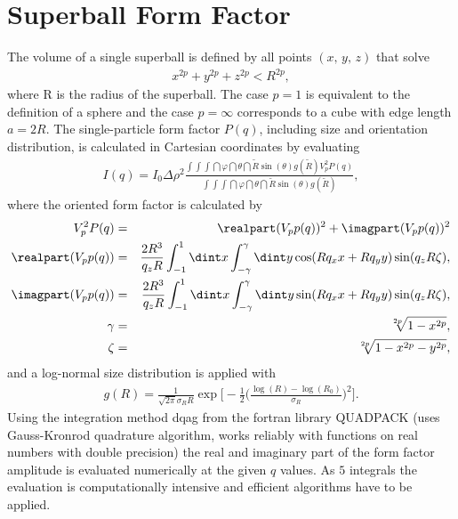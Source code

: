 \documentclass[\main/dresen_thesis.tex]{subfiles}
\begin{document}
\section{Superball Form Factor}\label{ch:appendix:numericalMethods:superballFormfactor}

The volume of a single superball is defined by all points $(x,\, y,\, z)$ that solve
\begin{align}
x^{2p} + y^{2p} + z^{2p} < R^{2p},
\end{align}
where R is the radius of the superball.  The case $p=1$ is equivalent to the definition of a sphere and the case $p=\infty$ corresponds to a cube with edge length $a=2R$. 
The single-particle form factor $P(q)$, including size and orientation distribution, is calculated in Cartesian coordinates by evaluating
\begin{align}
I(q) = I_0 \Delta \rho^2
\frac{\int \int \int \dint \varphi \dint \theta \dint \tilde{R}  \sin (\theta) g(\tilde{R})  V_p^2 P(q)}
{\int \int \int \dint \varphi \dint \theta \dint \tilde{R} \sin (\theta)  g(\tilde{R}) }, 
\label{eq:superball_intensity_equation}
\end{align}
where the oriented form factor is calculated by
\begin{eqnarray}
V_p^2 P(q) &=& \realpart (V_p p(q))^2 + \imagpart (V_p p(q))^2\\
\realpart (V_p p(q)) &=& \frac{2R^3}{q_z R} \int_{-1}^{1} \dint x \int_{-\gamma}^{\gamma} \dint y \cos(R q_x x + R q_y y)  \sin (q_z R \zeta),\\
\imagpart (V_p p(q)) &=& \frac{2R^3}{q_z R} \int_{-1}^{1} \dint x \int_{-\gamma}^{\gamma} \dint y \sin(R q_x x + R q_y y) \sin (q_z R \zeta),\\
\gamma &=& \sqrt[2p]{1-x^{2p}}, \\
\zeta &= &\sqrt[2p]{1-x^{2p} -y^{2p}},
\end{eqnarray}
and a log-normal size distribution is applied with
\begin{align}
g(R) = \frac{1}{\sqrt{2 \pi} \sigma_R R} \exp \Bigg[ - \frac{1}{2} \bigg(\frac{\log(R) - \log(R_0)}{\sigma_R} \bigg)^2 \Bigg]. 
\end{align}
Using the integration method dqag from the fortran library QUADPACK (uses Gauss-Kronrod quadrature algorithm, works reliably with functions on real numbers with double precision) the real and imaginary part of the form factor amplitude is evaluated numerically at the given $q$ values.
As $5$ integrals the evaluation is computationally intensive and efficient algorithms have to be applied.
\end{document}
